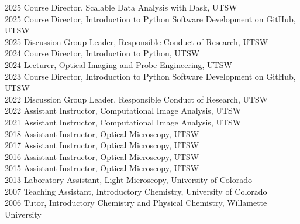 2025 \hspace{58pt} Course Director, Scalable Data Analysis with Dask, UTSW \\
2025 \hspace{58pt} Course Director, Introduction to Python Software Development on GitHub, UTSW \\
2025 \hspace{58pt} Discussion Group Leader, Responsible Conduct of Research, UTSW \\ 
2024 \hspace{58pt} Course Director, Introduction to Python, UTSW \\
2024 \hspace{58pt} Lecturer, Optical Imaging and Probe Engineering, UTSW \\
2023 \hspace{58pt} Course Director, Introduction to Python Software Development on GitHub, UTSW \\
2022 \hspace{58pt} Discussion Group Leader, Responsible Conduct of Research, UTSW \\ 
2022 \hspace{58pt} Assistant Instructor, Computational Image Analysis, UTSW \\
2021 \hspace{58pt} Assistant Instructor, Computational Image Analysis, UTSW \\
2018 \hspace{58pt} Assistant Instructor, Optical Microscopy, UTSW \\
2017 \hspace{58pt} Assistant Instructor, Optical Microscopy, UTSW \\
2016 \hspace{58pt} Assistant Instructor, Optical Microscopy, UTSW \\
2015 \hspace{58pt} Assistant Instructor, Optical Microscopy, UTSW \\
2013 \hspace{58pt} Laboratory Assistant, Light Microscopy, University of Colorado \\
2007 \hspace{58pt} Teaching Assistant, Introductory Chemistry, University of Colorado \\
2006 \hspace{58pt} Tutor, Introductory Chemistry and Physical Chemistry, Willamette University \\
\\ 
